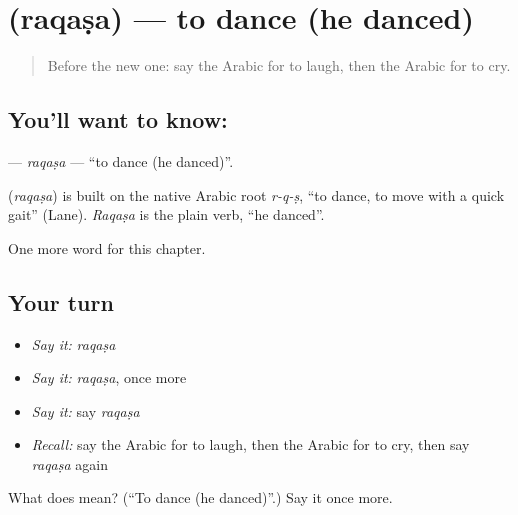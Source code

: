 \section[\texorpdfstring{\ar{رقص} (raqaṣa)}{رقص (raqaṣa)}]{ (raqaṣa) — to dance (he danced)}

\label{lesson:AR-C60-raqasa}



\begin{quote}
Before the new one: say the Arabic for to laugh, then the Arabic for to cry.
\end{quote}

\subsection*{You'll want to know: }
\textbf{} — \emph{raqaṣa} — \textquotedblleft{}to dance (he danced)\textquotedblright{}.

\begin{cousinweb}
\textbf{} (\emph{raqaṣa}) is built on the native Arabic root \emph{r-q-ṣ}, \textquotedblleft{}to dance, to move with a quick gait\textquotedblright{} (Lane). \emph{Raqaṣa} is the plain verb, \textquotedblleft{}he danced\textquotedblright{}.
\end{cousinweb}

\begin{grammarlens}[title={What you've built}]
One more word for this chapter.
\end{grammarlens}

\subsection*{Your turn}
\begin{itemize}
\raggedright
  \item \emph{Say it:} \emph{raqaṣa}
  \item \emph{Say it:} \emph{raqaṣa}, once more
  \item \emph{Say it:} say \emph{raqaṣa}
  \item \emph{Recall:} say the Arabic for to laugh, then the Arabic for to cry, then say \emph{raqaṣa} again
\end{itemize}

\begin{tcolorbox}[breakable,colback=teal!4,colframe=teal!35!black,title={Before you move on}]
What does  mean? (\textquotedblleft{}To dance (he danced)\textquotedblright{}.) Say it once more.
\end{tcolorbox}
